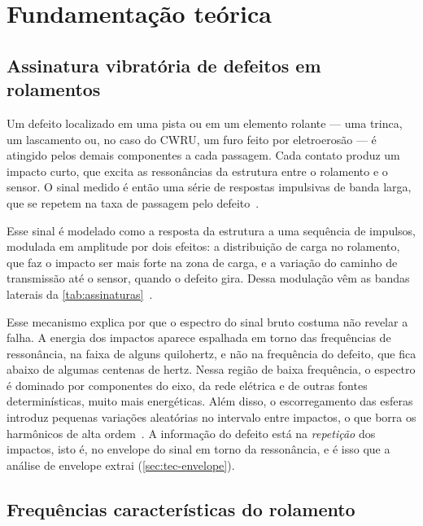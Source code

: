 \chapter{Fundamentação teórica}
\label{cap:fundamentacao}

\section{Assinatura vibratória de defeitos em rolamentos}
\label{sec:assinatura}

Um defeito localizado em uma pista ou em um elemento rolante --- uma trinca, um
lascamento ou, no caso do CWRU, um furo feito por eletroerosão --- é atingido
pelos demais componentes a cada passagem. Cada contato produz um impacto curto,
que excita as ressonâncias da estrutura entre o rolamento e o sensor. O sinal
medido é então uma série de respostas impulsivas de banda larga, que se repetem
na taxa de passagem pelo defeito~\cites{randall2011tutorial}[p.~101]{smith2015}.

Esse sinal é modelado como a resposta da estrutura a uma
sequência de impulsos, modulada em amplitude por dois efeitos: a distribuição
de carga no rolamento, que faz o impacto ser mais forte na zona de carga, e a
variação do caminho de transmissão até o sensor, quando o defeito gira. Dessa
modulação vêm as bandas laterais da \autoref{tab:assinaturas}~\cite{randall2011tutorial}.

Esse mecanismo explica por que o espectro do sinal bruto costuma não revelar a
falha. A energia dos impactos aparece espalhada em torno das frequências de
ressonância, na faixa de alguns quilohertz, e não na frequência do defeito, que
fica abaixo de algumas centenas de hertz. Nessa região de baixa frequência, o
espectro é dominado por componentes do eixo, da rede elétrica e de outras fontes
determinísticas, muito mais energéticas. Além disso, o escorregamento das esferas
introduz pequenas variações aleatórias no intervalo entre impactos, o que borra
os harmônicos de alta ordem~\cite{randall2011tutorial}. A informação do defeito
está na \emph{repetição} dos impactos, isto é, no envelope do sinal em torno da
ressonância, e é isso que a análise de envelope extrai
(\autoref{sec:tec-envelope}).

\section{Frequências características do rolamento}
\label{sec:frequencias-caracteristicas}

